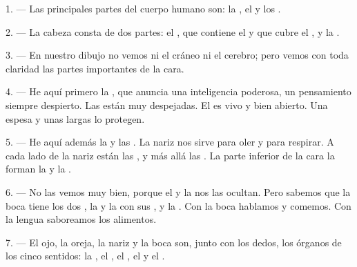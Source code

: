 
\VUsaut{4.0mm}
\VUsaut{2.0mm}

\VUsaut{2.4mm}
\VUsaut{3.0mm}

1. --- Las principales partes del cuerpo humano son: la , el
 y los .

\VUsaut{3.0mm}

2. --- La cabeza consta de dos partes: el , que contiene el
 y que cubre el , y la .

3. --- En nuestro dibujo no vemos ni el cráneo ni el cerebro; pero vemos
con toda claridad las partes importantes de la cara.

4. --- He aquí primero la , que anuncia una inteligencia
poderosa, un pensamiento siempre despierto. Las  están muy
despejadas. El  es vivo y bien abierto. Una  espesa
y unas  largas lo protegen.

5. --- He aquí además la  y las .
La nariz nos sirve para oler y para respirar. A cada lado de la nariz
están las , y más allá las . La parte
inferior de la cara la forman la  y la .

6. --- No las vemos muy bien, porque el  y la 
nos las ocultan. Pero sabemos que la boca tiene los dos , la
 y la  con sus
, y la . Con la boca hablamos y comemos. Con
la lengua saboreamos los alimentos.

7. --- El ojo, la oreja, la nariz y la boca son, junto con los dedos, los
órganos de los cinco sentidos: la , el , el
, el  y el .

